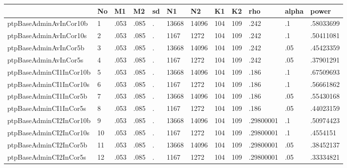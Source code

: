 \begin{table}[htbp]
\begin{tabular}{|l|l|l|l|l|l|l|l|l|l|l|l|}\hline  
 & No  & M1  & M2  & sd  & N1  & N2  & K1  & K2  & rho  & alpha  & power  \\ \hline  
ptpBaseAdminAvInCor10b & 1 & .053 & .085 & . & 13668 & 14096 & 104 & 109 & .242 & .1 & .58033699 \\ \hline 
ptpBaseAdminAvInCor10s & 2 & .053 & .085 & . & 1167 & 1272 & 104 & 109 & .242 & .1 & .50411081 \\ \hline 
ptpBaseAdminAvInCor5b & 3 & .053 & .085 & . & 13668 & 14096 & 104 & 109 & .242 & .05 & .45423359 \\ \hline 
ptpBaseAdminAvInCor5s & 4 & .053 & .085 & . & 1167 & 1272 & 104 & 109 & .242 & .05 & .37901291 \\ \hline 
ptpBaseAdminCI1InCor10b & 5 & .053 & .085 & . & 13668 & 14096 & 104 & 109 & .186 & .1 & .67509693 \\ \hline 
ptpBaseAdminCI1InCor10s & 6 & .053 & .085 & . & 1167 & 1272 & 104 & 109 & .186 & .1 & .56661862 \\ \hline 
ptpBaseAdminCI1InCor5b & 7 & .053 & .085 & . & 13668 & 14096 & 104 & 109 & .186 & .05 & .55430168 \\ \hline 
ptpBaseAdminCI1InCor5s & 8 & .053 & .085 & . & 1167 & 1272 & 104 & 109 & .186 & .05 & .44023159 \\ \hline 
ptpBaseAdminCI2InCor10b & 9 & .053 & .085 & . & 13668 & 14096 & 104 & 109 & .29800001 & .1 & .50974423 \\ \hline 
ptpBaseAdminCI2InCor10s & 10 & .053 & .085 & . & 1167 & 1272 & 104 & 109 & .29800001 & .1 & .4554151 \\ \hline 
ptpBaseAdminCI2InCor5b & 11 & .053 & .085 & . & 13668 & 14096 & 104 & 109 & .29800001 & .05 & .38452137 \\ \hline 
ptpBaseAdminCI2InCor5s & 12 & .053 & .085 & . & 1167 & 1272 & 104 & 109 & .29800001 & .05 & .33334821 \\ \hline 
  \end{tabular}
\end{table}
